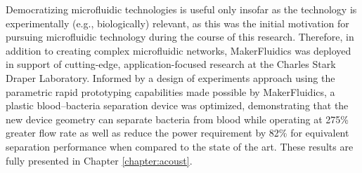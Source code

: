 Democratizing microfluidic technologies is useful only insofar as the technology is experimentally (e.g., biologically) relevant, as this was the initial motivation for pursuing microfluidic technology during the course of this research. Therefore, in addition to creating complex microfluidic networks, MakerFluidics was deployed in support of cutting-edge, application-focused research at the Charles Stark Draper Laboratory. Informed by a design of experiments approach using the parametric rapid prototyping capabilities made possible by MakerFluidics, a plastic blood--bacteria separation device was optimized, demonstrating that the new device geometry can separate bacteria from blood while operating at 275\% greater flow rate as well as reduce the power requirement by 82\% for equivalent separation performance when compared to the state of the art. These results are fully presented in Chapter \ref{chapter:acoust}.







